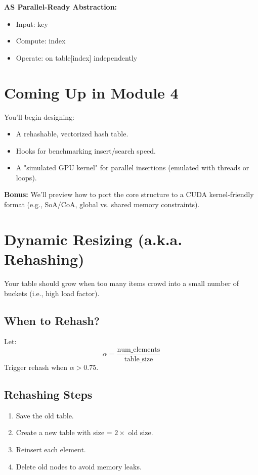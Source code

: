 \documentclass{article}
\begin{document}
\textbf{AS Parallel-Ready Abstraction:}
\begin{itemize}
    \item Input: key
    \item Compute: index
    \item Operate: on table[index] independently
\end{itemize}

\section*{Coming Up in Module 4}

You’ll begin designing:
\begin{itemize}
    \item A rehashable, vectorized hash table.
    \item Hooks for benchmarking insert/search speed.
    \item A "simulated GPU kernel" for parallel insertions (emulated with threads or loops).
\end{itemize}

\textbf{Bonus:} We’ll preview how to port the core structure to a CUDA kernel-friendly format (e.g., SoA/CoA, global vs. shared memory constraints).

\section*{Dynamic Resizing (a.k.a. Rehashing)}

Your table should grow when too many items crowd into a small number of buckets (i.e., high load factor).

\subsection*{When to Rehash?}
Let:
\[
\alpha = \frac{\text{num\_elements}}{\text{table\_size}}
\]
Trigger rehash when \( \alpha > 0.75 \).

\subsection*{Rehashing Steps}
\begin{enumerate}
    \item Save the old table.
    \item Create a new table with size = \(2 \times \) old size.
    \item Reinsert each element.
    \item Delete old nodes to avoid memory leaks.
\end{enumerate}
\end{document}
